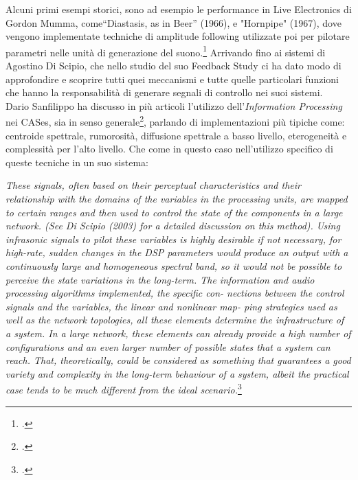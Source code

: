 Alcuni primi esempi storici,
sono ad esempio le performance in Live Electronics di Gordon Mumma, 
come“Diastasis, as in Beer” (1966), e "Hornpipe" (1967), 
dove vengono implementate techniche di amplitude following utilizzate 
poi per pilotare parametri nelle unità di generazione del suono.\footcite{sanfilippo_time-domain_2021}
Arrivando fino ai sistemi di Agostino Di Scipio, che nello studio del suo
Feedback Study ci ha dato modo di approfondire e scoprire
tutti quei meccanismi e tutte quelle particolari funzioni che hanno la responsabilità
di generare segnali di controllo nei suoi sistemi. \\
Dario Sanfilippo ha discusso in più articoli l'utilizzo dell'\textit{Information Processing} 
nei CASes, sia in senso generale\footcite{sanfilippo_time-domain_2021}, 
parlando di implementazioni più tipiche come: 
centroide spettrale, rumorosità, diffusione spettrale a basso livello, eterogeneità e
complessità per l'alto livello.
Che come in questo caso nell'utilizzo specifico di queste tecniche 
in un suo sistema:

\begin{center}
    \vspace{0.5cm}
    \textit{These signals, often based on
    their perceptual characteristics and their relationship with the domains of the variables
    in the processing units, are mapped to certain ranges and then used to control the state
    of the components in a large network. (See Di Scipio (2003) for a detailed discussion
    on this method). Using infrasonic signals to pilot these variables is highly desirable if
    not necessary, for high-rate, sudden changes in the DSP parameters would produce an
    output with a continuously large and homogeneous spectral band, so it would not be
    possible to perceive the state variations in the long-term.
    The information and audio processing algorithms implemented, the specific con-
    nections between the control signals and the variables, the linear and nonlinear map-
    ping strategies used as well as the network topologies, all these elements determine the
    infrastructure of a system. In a large network, these elements can already provide a high
    number of configurations and an even larger number of possible states that a system
    can reach. That, theoretically, could be considered as something that guarantees a good
    variety and complexity in the long-term behaviour of a system, albeit the practical case
    tends to be much different from the ideal scenario.}\footcite{sanfilippo_time-variant_2018}
    \vspace{0.5cm}
\end{center}

